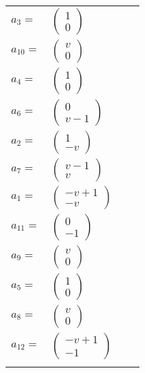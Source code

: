 \documentclass[1p]{elsarticle_modified}
\theoremstyle{definition}
\begin{document}
\begin{tabular}{m{7pt} m{180pt} m{7pt} m{180pt} }
\flushright $a_{3}=$&$\begin{pmatrix}1\\0\end{pmatrix}$ \\
\flushright $a_{10}=$&$\begin{pmatrix}v\\0\end{pmatrix}$ \\
\flushright $a_{4}=$&$\begin{pmatrix}1\\0\end{pmatrix}$ \\
\flushright $a_{6}=$&$\begin{pmatrix}0\\v-1\end{pmatrix}$ \\
\flushright $a_{2}=$&$\begin{pmatrix}1\\- v\end{pmatrix}$ \\
\flushright $a_{7}=$&$\begin{pmatrix}v-1\\v\end{pmatrix}$ \\
\flushright $a_{1}=$&$\begin{pmatrix}- v+1\\- v\end{pmatrix}$ \\
\flushright $a_{11}=$&$\begin{pmatrix}0\\-1\end{pmatrix}$ \\
\flushright $a_{9}=$&$\begin{pmatrix}v\\0\end{pmatrix}$ \\
\flushright $a_{5}=$&$\begin{pmatrix}1\\0\end{pmatrix}$ \\
\flushright $a_{8}=$&$\begin{pmatrix}v\\0\end{pmatrix}$ \\
\flushright $a_{12}=$&$\begin{pmatrix}- v+1\\-1\end{pmatrix}$\\&\end{tabular}
\end{document}

